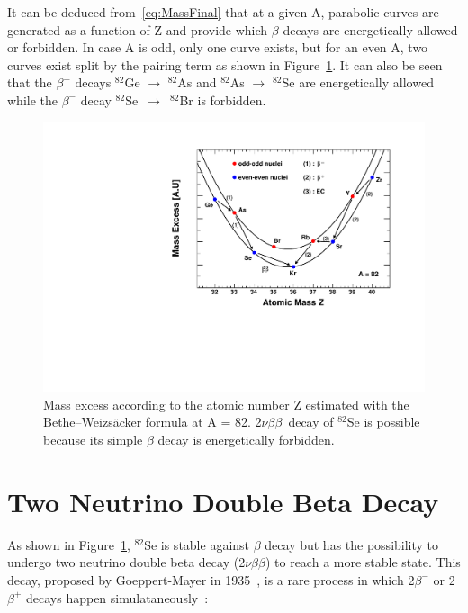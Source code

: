\documentclass[main.tex]{subfiles}
\begin{document}
\NI It can be deduced from~\ref{eq:MassFinal} that at a given A, parabolic curves are generated as a function of Z and provide which $\beta$ decays are energetically allowed or forbidden. In case A is odd, only one curve exists, but for an even A, two curves exist split by the pairing term as shown in Figure~\ref{WeizsackerParabola}. It can also be seen that the $\beta^-$ decays $^{\text{82}}$Ge $\rightarrow$ $^{\text{82}}$As and $^{\text{82}}$As $\rightarrow$ $^{\text{82}}$Se are energetically allowed while the $\beta^-$ decay $^{\text{82}}$Se~$\rightarrow$~$^{\text{82}}$Br is forbidden.


\begin{figure}[h!]
\begin{center}
\includegraphics[scale=0.55]{pictures/Chap2/WeizsackerParabola_v4.pdf}
\caption{Mass excess according to the atomic number Z estimated with the Bethe–Weizsäcker formula at A = 82. 2$\nu\beta\beta$~decay of $^{\text{82}}$Se is possible because its simple $\beta$ decay is energetically forbidden.}
\label{WeizsackerParabola}
\end{center}
\end{figure}


\FloatBarrier



\section{Two Neutrino Double Beta Decay}\label{sec:2NeutrinoDBD}


\NI As shown in Figure~\ref{WeizsackerParabola}, $^{\text{82}}$Se is stable against $\beta$ decay but has the possibility to undergo two neutrino double beta decay (2$\nu\beta\beta$) to reach a more stable state. This decay, proposed by Goeppert-Mayer in 1935~\cite{GoeppertMayerDoubleBetaDecay}, is a rare process in which 2$\beta^{-}$ or 2$\beta^{+}$ decays happen simulataneously~: 
\end{document}
